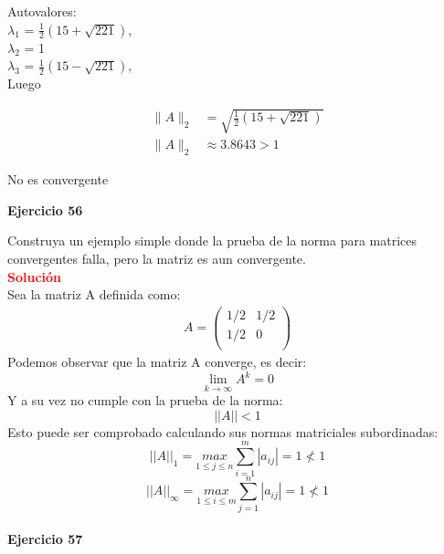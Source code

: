 \documentclass[12pt]{article}
\begin{document}
\begin{enumerate}
Autovalores: \\
$\lambda_1$ = $\frac{1}{2}(15+\sqrt{221})$, \\
$\lambda_2$ = 1 \\
$\lambda_3$ = $\frac{1}{2}(15-\sqrt{221})$, \\

Luego 

\begin{align*}
    \parallel A \parallel_2 &= \sqrt{\frac{1}{2}(15+\sqrt{221})}\\
    \parallel A \parallel_2 &\approx 3.8643 > 1
\end{align*}

No es convergente

\end{enumerate}


\noindent \textbf{Ejercicio 56}

Construya un ejemplo simple donde la prueba de la norma  para matrices convergentes falla, pero la matriz es aun convergente.\\

\noindent \textcolor{red}{\bf Soluci\'on}\\
    Sea la matriz A definida como:
    \begin{align*}
    A =
    \left( {\begin{array}{ccccc}
        1/2 &1/2 \\
        1/2 & 0\\
        \end{array} } \right)
\end{align*}
Podemos observar que la matriz A converge, es decir:
\[
\lim_{k \to \infty}A^k=0
\]
Y a su vez no cumple con la prueba de la norma:
$$||A||  < 1$$
Esto puede ser comprobado calculando sus normas matriciales subordinadas:
$$
||A||_{1} = \underset{1 \leq j\leq n}{max} \sum_{i=1}^m|a_{ij}| = 1 \nless 1
$$
$$
||A||_{\infty} = \underset{1 \leq i\leq m}{max} \sum_{j=1}^n|a_{ij}| = 1 \nless 1
$$\\


\noindent \textbf{Ejercicio 57}
\end{document}
